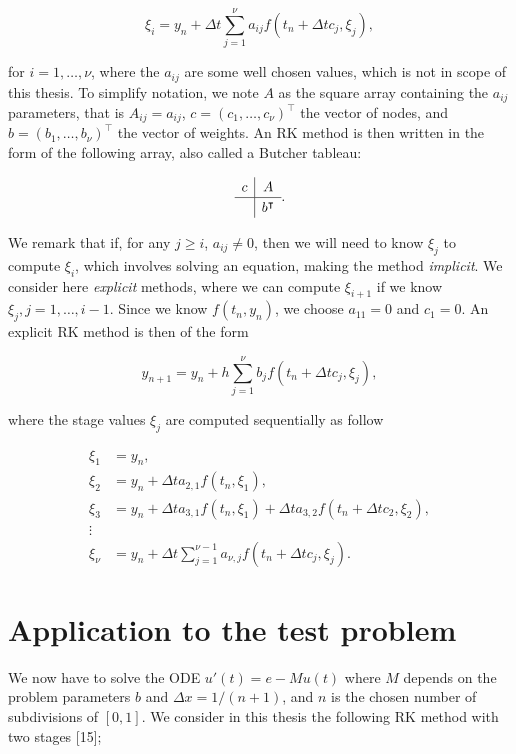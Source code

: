 \documentclass[
  letterpaper,
]{report}
\theoremstyle{plain}
\theoremstyle{definition}
\theoremstyle{definition}
\theoremstyle{remark}
\begin{document}
\[
\xi_i = y_n + \Delta t \sum_{j=1}^\nu a_{ij}f(t_n+\Delta t c_j, \xi_j),
\]

for \(i = 1,\dots, \nu\), where the \(a_{ij}\) are some well chosen
values, which is not in scope of this thesis. To simplify notation, we
note \(A\) as the square array containing the \(a_{ij}\) parameters,
that is \(A_{ij} = a_{ij}\), \(c = (c_1,\dots,c_\nu)^\intercal\) the
vector of nodes, and \(b = (b_1,\dots, b_\nu)^\intercal\) the vector of
weights. An RK method is then written in the form of the following
array, also called a Butcher tableau:

\[
\renewcommand\arraystretch{1.2}
\begin{array}
{c|c}
c & A\\
\hline & b^\intercal
\end{array}.
\]

We remark that if, for any \(j\geq i\), \(a_{ij} \neq 0\), then we will
need to know \(\xi_j\) to compute \(\xi_i\), which involves solving an
equation, making the method \emph{implicit}. We consider here
\emph{explicit} methods, where we can compute \(\xi_{i+1}\) if we know
\(\xi_j, j = 1 , \dots , i-1\). Since we know \(f(t_n,y_n)\), we choose
\(a_{11} = 0\) and \(c_1 = 0\). An explicit RK method is then of the
form

\[
y_{n+1} = y_n + h\sum_{j=1}^\nu b_j f(t_n+\Delta t c_j,\xi_j),
\]

where the stage values \(\xi_j\) are computed sequentially as follow

\begin{align*}
\xi_1 &= y_n,\\
\xi_2 &= y_n + \Delta t a_{2,1}f(t_n,\xi_1),\\
\xi_3 &= y_n + \Delta t a_{3,1}f(t_n,\xi_1) +  \Delta t a_{3,2}f(t_n+\Delta t c_2,\xi_2),\\
\vdots\\
\xi_\nu &= y_n + \Delta t \sum_{j=1}^{\nu-1} a_{\nu,j}f(t_n + \Delta t c_j,\xi_j).
\end{align*}

\hypertarget{sec-RK_solver_test_problem}{%
\section{Application to the test
problem}\label{sec-RK_solver_test_problem}}

We now have to solve the ODE \(u'(t) = e - Mu(t)\) where \(M\) depends
on the problem parameters \(b\) and \(\Delta x = 1 / (n+1)\), and \(n\)
is the chosen number of subdivisions of \([0,1]\). We consider in this
thesis the following RK method with two stages {[}15{]};
\end{document}
